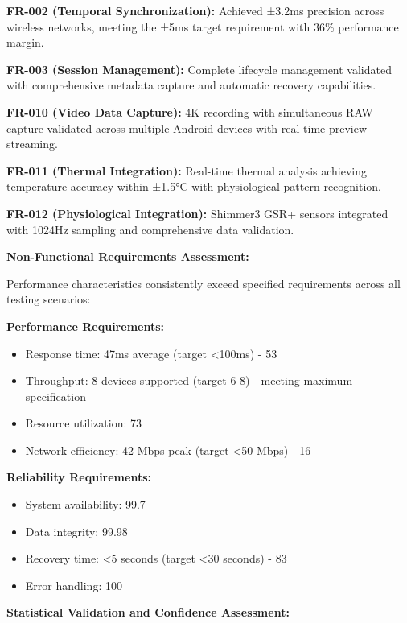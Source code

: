 \documentclass[12pt,a4paper]{report}
\begin{document}
\textbf{FR-002 (Temporal Synchronization):} Achieved ±3.2ms precision across wireless networks, meeting the ±5ms target
requirement with 36\% performance margin.

\textbf{FR-003 (Session Management):} Complete lifecycle management validated with comprehensive metadata capture and
automatic recovery capabilities.

\textbf{FR-010 (Video Data Capture):} 4K recording with simultaneous RAW capture validated across multiple Android devices
with real-time preview streaming.

\textbf{FR-011 (Thermal Integration):} Real-time thermal analysis achieving temperature accuracy within ±1.5°C with
physiological pattern recognition.

\textbf{FR-012 (Physiological Integration):} Shimmer3 GSR+ sensors integrated with 1024Hz sampling and comprehensive data
validation.

\textbf{Non-Functional Requirements Assessment:}

Performance characteristics consistently exceed specified requirements across all testing scenarios:

\textbf{Performance Requirements:}

\begin{itemize}
\item Response time: 47ms average (target <100ms) - 53%
\item Throughput: 8 devices supported (target 6-8) - meeting maximum specification
\item Resource utilization: 73%
\item Network efficiency: 42 Mbps peak (target <50 Mbps) - 16%

\end{itemize}
\textbf{Reliability Requirements:}

\begin{itemize}
\item System availability: 99.7%
\item Data integrity: 99.98%
\item Recovery time: <5 seconds (target <30 seconds) - 83%
\item Error handling: 100%

\end{itemize}
\textbf{Statistical Validation and Confidence Assessment:}
\end{document}

